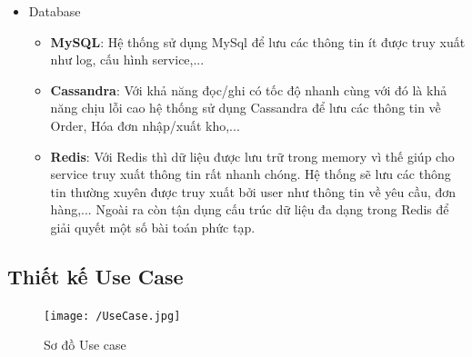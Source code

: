 \begin{itemize}
				\item Database
				\begin{itemize}
					\item \textbf{MySQL}: Hệ thống sử dụng MySql để lưu các thông tin ít được truy xuất như log, cấu hình service,...
					\item \textbf{Cassandra}: Với khả năng đọc/ghi có tốc độ nhanh cùng với đó là khả năng chịu lỗi cao hệ thống sử dụng Cassandra để lưu các thông tin về Order, Hóa đơn nhập/xuất kho,...
					\item \textbf{Redis}: Với Redis thì dữ liệu được lưu trữ trong memory vì thế giúp cho service truy xuất thông tin rất nhanh chóng. Hệ thống sẽ lưu các thông tin thường xuyên được truy xuất bởi user như thông tin về yêu cầu, đơn hàng,... Ngoài ra còn tận dụng cấu trúc dữ liệu đa dạng trong Redis để giải quyết một số bài toán phức tạp. 
				\end{itemize}
		
		\end{itemize}

\newpage
\subsection{Thiết kế Use Case}

\begin{figure}[!ht]
	\texttt{[image: /UseCase.jpg]}
	\centering
	\linebreak
	\caption{Sơ đồ Use case}
\end{figure}

